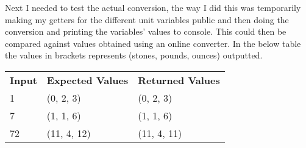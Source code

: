 \documentclass[a4paper]{article}
\begin{document}
Next I needed to test the actual conversion, the way I did this was temporarily making my getters for the different unit variables public and then 
doing the conversion and printing the variables' values to console. This could then be compared against values obtained using an online converter.
In the below table the values in brackets represents (stones, pounds, ounces) outputted.
\begin{table}[!h]
\begin{tabular}{lll}
\textbf{Input} & \textbf{Expected Values} & \textbf{Returned Values} \\
1              & (0, 2, 3)                & (0, 2, 3)                \\
7              & (1, 1, 6)                & (1, 1, 6)                \\
72             & (11, 4, 12)              & (11, 4, 11)             
\end{tabular}
\end{table}
\end{document}
